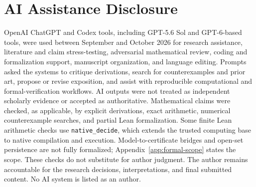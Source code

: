 \documentclass[11pt]{article}
\theoremstyle{remark}
\begin{document}
\section*{AI Assistance Disclosure}
OpenAI ChatGPT and Codex tools, including GPT-5.6 Sol and GPT-6-based tools, were used between September and October 2026 for research assistance, literature and claim stress-testing, adversarial mathematical review, coding and formalization support, manuscript organization, and language editing. Prompts asked the systems to critique derivations, search for counterexamples and prior art, propose or revise exposition, and assist with reproducible computational and formal-verification workflows. AI outputs were not treated as independent scholarly evidence or accepted as authoritative. Mathematical claims were checked, as applicable, by explicit derivations, exact arithmetic, numerical counterexample searches, and partial Lean formalization. Some finite Lean arithmetic checks use \texttt{native\_decide}, which extends the trusted computing base to native compilation and execution. Model-to-certificate bridges and open-set persistence are not fully formalized; Appendix~\ref{app:formal-scope} states the scope. These checks do not substitute for author judgment. The author remains accountable for the research decisions, interpretations, and final submitted content. No AI system is listed as an author.

\appendix




\end{document}
